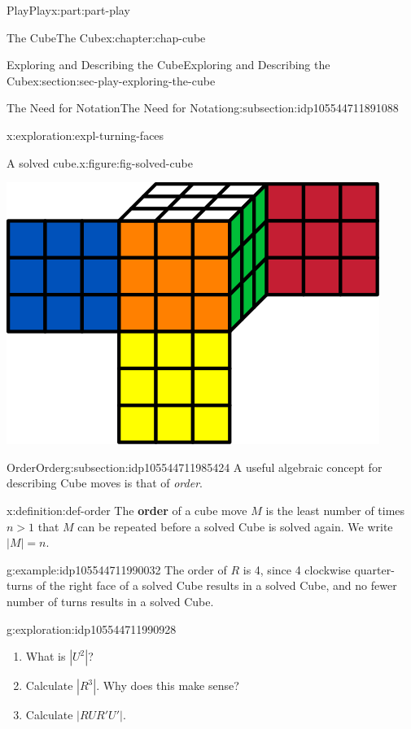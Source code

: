\documentclass[oneside,10pt,]{book}
\newcommand{\terminology}[1]{\textbf{#1}}
\numberwithin{equation}{section}
\newcommand{\gt}{>}
\begin{document}
\begin{partptx}{Play}{}{Play}{}{}{x:part:part-play}
\begin{chapterptx}{The Cube}{}{The Cube}{}{}{x:chapter:chap-cube}
\begin{sectionptx}{Exploring and Describing the Cube}{}{Exploring and Describing the Cube}{}{}{x:section:sec-play-exploring-the-cube}
\begin{subsectionptx}{The Need for Notation}{}{The Need for Notation}{}{}{g:subsection:idp105544711891088}
\begin{exploration}{}{x:exploration:expl-turning-faces}
\begin{figureptx}{A solved cube.}{x:figure:fig-solved-cube}{}
\begin{image}{0.25}{0.5}{0.25}
\includegraphics[width=\linewidth]{./images/solved_cube_sf.svg}
\end{image}%
\tcblower
\end{figureptx}%
\end{exploration}%
\end{subsectionptx}
%
%
\typeout{************************************************}
\typeout{************************************************}
%
\begin{subsectionptx}{Order}{}{Order}{}{}{g:subsection:idp105544711985424}
A useful algebraic concept for describing Cube moves is that of \emph{order}.%
\begin{definition}{}{x:definition:def-order}%
%
The \terminology{order} of a cube move \(M\) is the least number of times \(n \gt 1\) that \(M\) can be repeated before a solved Cube is solved again. We write \(|M| = n\).%
\end{definition}
\begin{example}{}{g:example:idp105544711990032}%
The order of \(R\) is 4, since 4 clockwise quarter-turns of the right face of a solved Cube results in a solved Cube, and no fewer number of turns results in a solved Cube.%
\end{example}
\begin{exploration}{}{g:exploration:idp105544711990928}%
%
\begin{enumerate}
\item{}What is \(|U^2|\)?%
\item{}Calculate \(|R^3|\). Why does this make sense?%
\item{}Calculate \(|RUR' U '|\).%
\end{enumerate}

\end{exploration}
\end{subsectionptx}
\end{sectionptx}
\end{chapterptx}
\end{partptx}
\end{document}
